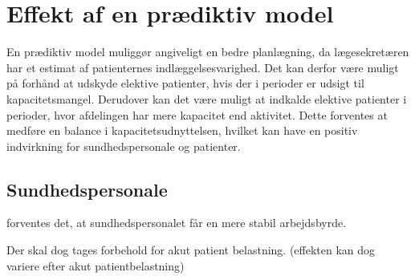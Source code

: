 

\section{Effekt af en prædiktiv model}
En prædiktiv model muliggør angiveligt en bedre planlægning, da lægesekretæren har et estimat af patienternes indlæggelsesvarighed.
Det kan derfor være muligt på forhånd at udskyde elektive patienter, hvis der i perioder er udsigt til kapacitetsmangel.
Derudover kan det være muligt at indkalde elektive patienter i perioder, hvor afdelingen har mere kapacitet end aktivitet. 
Dette forventes at medføre en balance i kapacitetsudnyttelsen, hvilket kan have en positiv indvirkning for sundhedspersonale og patienter. 




\subsection{Sundhedspersonale} \label{sundper}
forventes det, at sundhedspersonalet får en mere stabil arbejdsbyrde. 

Der skal dog tages forbehold for akut patient belastning. (effekten kan dog variere efter akut patientbelastning)


